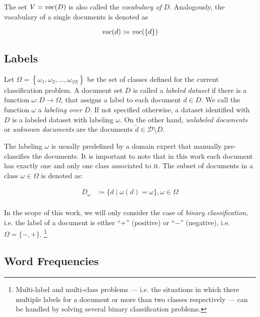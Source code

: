 The set $V=\mathit{voc}(D)$ is also called the \emph{vocabulary of }$D$.
Analogously, the vocabulary of a single documents is denoted as

\begin{equation*}
\mathit{voc}(d) \coloneqq \mathit{voc}(\{d\})
\end{equation*}

\subsection{Labels}

Let $\Omega=\left\{\omega_1, \omega_2,\ldots,\omega_{|\Omega|}\right\}$ be the
set of classes defined for the current classification problem. A document set
$D$ is called a \emph{labeled dataset} if there is a function $\omega: D \to
\Omega$, that assigns a label to each document $d \in D$. We call the function
$\omega$ a \emph{labeling over} $D$. If not specified otherwise, a dataset
identified with $D$ is a labeled dataset with labeling $\omega$.
On the other hand, \emph{unlabeled documents} or \emph{unknown documents} are
the documents $\tilde{d} \in \mathcal{D}\setminus D$. 

The labeling $\omega$ is usually predefined by a domain expert
that manually pre-classifies the documents.
It is important to note that in this work each document has exactly one and only
one class associated to it. The subset of documents in a class $\omega \in
\Omega$ is denoted as:

\begin{equation*}
\begin{split}
D_\omega &\coloneqq  \{ d \mid \omega(d) = \omega\}, \omega \in \Omega \\
\end{split}
\end{equation*}

In the scope of this work, we will only consider the case of
\emph{binary classification}, i.e. the label of a document is either ``$+$''
(positive) or ``$-$'' (negative), i.e.  $\Omega = \{-,+\}$. \footnote{Multi-label
and multi-class problems --- i.e. the situations in which there multiple labels
for a document or more than two classes respectively --- can be handled by
solving several binary classification problems.}

\subsection{Word Frequencies}

